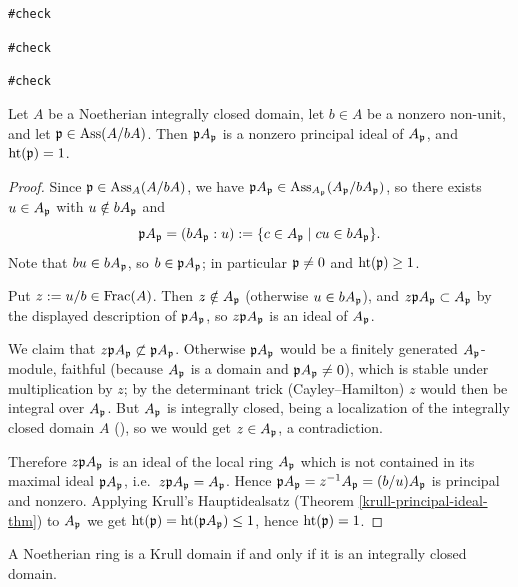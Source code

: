 \noindent\verb|#check |

\noindent\verb|#check |

\noindent\verb|#check |

\begin{lem}
\label{ass-prime-of-quotient-by-element}
Let $A$ be a Noetherian integrally closed domain, let $b\in A$ be a nonzero
non-unit, and let ${\mathfrak{p}}\in\operatorname{Ass}(A/bA)$.
Then ${\mathfrak{p}} A_{\mathfrak{p}}$ is a nonzero principal ideal of $A_{\mathfrak{p}}$, and ${\mathrm{ht}}({\mathfrak{p}})=1$.
\end{lem}

\begin{proof}
Since ${\mathfrak{p}}\in\operatorname{Ass}_A(A/bA)$, we have ${\mathfrak{p}} A_{\mathfrak{p}}\in\operatorname{Ass}_{A_{\mathfrak{p}}}(A_{\mathfrak{p}}/bA_{\mathfrak{p}})$,
so there exists $u\in A_{\mathfrak{p}}$ with $u\notin bA_{\mathfrak{p}}$ and
$${\mathfrak{p}} A_{\mathfrak{p}}=(bA_{\mathfrak{p}}:u):=\{c\in A_{\mathfrak{p}}\mid cu\in bA_{\mathfrak{p}}\}.$$
Note that $bu\in bA_{\mathfrak{p}}$, so $b\in{\mathfrak{p}} A_{\mathfrak{p}}$; in particular ${\mathfrak{p}}\neq 0$ and
${\mathrm{ht}}({\mathfrak{p}})\geq 1$.

Put $z:=u/b\in{\mathrm{Frac}}(A)$. Then $z\notin A_{\mathfrak{p}}$ (otherwise $u\in bA_{\mathfrak{p}}$),
and $z{\mathfrak{p}} A_{\mathfrak{p}}\subset A_{\mathfrak{p}}$ by the displayed description of ${\mathfrak{p}} A_{\mathfrak{p}}$,
so $z{\mathfrak{p}} A_{\mathfrak{p}}$ is an ideal of $A_{\mathfrak{p}}$.

We claim that $z{\mathfrak{p}} A_{\mathfrak{p}}\not\subset{\mathfrak{p}} A_{\mathfrak{p}}$.
Otherwise ${\mathfrak{p}} A_{\mathfrak{p}}$ would be a finitely generated $A_{\mathfrak{p}}$-module,
faithful (because $A_{\mathfrak{p}}$ is a domain and ${\mathfrak{p}} A_{\mathfrak{p}}\neq 0$),
which is stable under multiplication by $z$; by the determinant trick
(Cayley--Hamilton) $z$ would then be integral over $A_{\mathfrak{p}}$.
But $A_{\mathfrak{p}}$ is integrally closed, being a localization of the integrally closed
domain $A$ (), so we would get
$z\in A_{\mathfrak{p}}$, a contradiction.

Therefore $z{\mathfrak{p}} A_{\mathfrak{p}}$ is an ideal of the local ring $A_{\mathfrak{p}}$ which is not
contained in its maximal ideal ${\mathfrak{p}} A_{\mathfrak{p}}$, i.e.~$z{\mathfrak{p}} A_{\mathfrak{p}}=A_{\mathfrak{p}}$.
Hence ${\mathfrak{p}} A_{\mathfrak{p}}=z^{-1}A_{\mathfrak{p}}=(b/u)A_{\mathfrak{p}}$ is principal and nonzero.
Applying Krull's Hauptidealsatz (Theorem \ref{krull-principal-ideal-thm}) to
$A_{\mathfrak{p}}$ we get ${\mathrm{ht}}({\mathfrak{p}})={\mathrm{ht}}({\mathfrak{p}} A_{\mathfrak{p}})\leq 1$, hence ${\mathrm{ht}}({\mathfrak{p}})=1$.
\end{proof}

\begin{prop}
\label{noeth-ring-is-krull-domain-iff}
\leanok
{}
A Noetherian ring is a Krull domain if and only if it is an integrally closed domain.
\end{prop}

